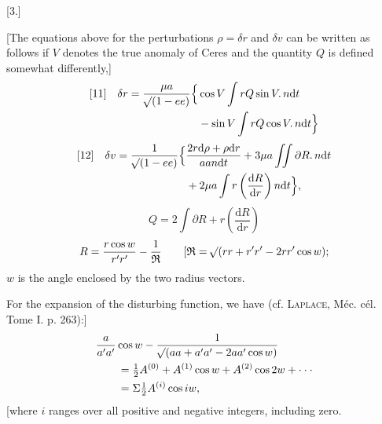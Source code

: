 \begingroup
\setlength{\abovedisplayskip}{8pt plus2pt minus1pt}
\setlength{\belowdisplayskip}{8pt plus2pt minus1pt}
\setlength{\abovedisplayshortskip}{4pt plus2pt}
\setlength{\belowdisplayshortskip}{6pt plus2pt minus1pt}
\par\bigskip
\hypertarget{native-387-ceres3}{}
\begin{center}[3.]\end{center}
\noindent\hspace*{\parindent}[The equations above for the perturbations \(\rho=\delta r\) and \(\delta v\) can be written as follows if \(V\) denotes the true anomaly of Ceres and the quantity \(Q\) is defined somewhat differently,]
\[
\begin{aligned}
{}[11]\quad\delta r=\frac{\mu a}{\mathord{{}^{}\!\surd}(1-ee)}\Big\{&\cos V\int rQ\sin V\mathord{.}\,n\mathrm{d}t\\
&-\sin V\int rQ\cos V\mathord{.}\,n\mathrm{d}t\Big\}
\end{aligned}
\]
\[
\begin{aligned}
{}[12]\quad\delta v=\frac{1}{\mathord{{}^{}\!\surd}(1-ee)}\Big\{&\frac{2r\mathrm{d}\rho+\rho\mathrm{d}r}{aan\mathrm{d}t}+3\mu a\iint\partial R\mathord{.}\,n\mathrm{d}t\\
&+2\mu a\int r\left(\frac{\mathrm{d}R}{\mathrm{d}r}\right)n\mathrm{d}t\Big\},
\end{aligned}
\]
\noindent[where]
\[Q=2\int\partial R+r\left(\frac{\mathrm{d}R}{\mathrm{d}r}\right)\]
\[
R=\frac{r\cos w}{r'r'}-\frac{1}{\mathfrak{R}}\qquad
[\mathfrak{R}=\mathord{{}^{}\!\surd}(rr+r'r'-2rr'\cos w);
\]
\noindent\(w\) is the angle enclosed by the two radius vectors.

For the expansion of the disturbing function, we have (cf. \textsc{Laplace}, Méc. cél. Tome I. p. 263):]
\[
\begin{aligned}
&\frac{a}{a'a'}\cos w-\frac{1}{\mathord{{}^{}\!\surd}(aa+a'a'-2aa'\cos w)}\\
&\qquad=\tfrac12 A^{(0)}+A^{(1)}\cos w+A^{(2)}\cos2w+\cdot\cdot\cdot\\
&\qquad=\Sigma\tfrac12 A^{(i)}\cos iw,
\end{aligned}
\]
\noindent[where \(i\) ranges over all positive and negative integers, including zero.

